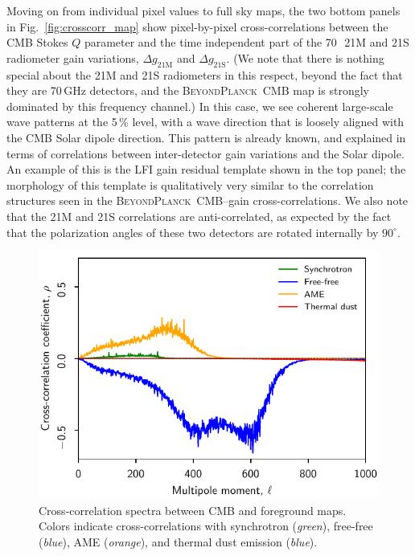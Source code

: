 \documentclass[twocolumn]{aa}
\newcommand{\BP}{\textsc{BeyondPlanck}}
\begin{document}
Moving on from individual pixel values to full sky maps, the two
bottom panels in Fig.~\ref{fig:crosscorr_map} show pixel-by-pixel
cross-correlations between the CMB Stokes $Q$ parameter and the
time independent part of the 70\,\GHz\ 21M and 21S radiometer gain variations,
$\Delta g_{\mathrm{21M}}$ and $\Delta g_{\mathrm{21S}}$. (We note that
there is nothing special about the 21M and 21S radiometers in this
respect, beyond the fact that they are 70\,GHz detectors, and the
\BP\ CMB map is strongly dominated by this frequency channel.) In this
case, we see coherent large-scale wave patterns at the 5\,\% level,
with a wave direction that is loosely aligned with the CMB Solar
dipole direction. This pattern is already known, and explained in
terms of correlations between inter-detector gain variations and the
Solar dipole. An example of this is the LFI gain residual template
\citep{planck2016-l02} shown in the top panel; the morphology of this
template is qualitatively very similar to the correlation structures
seen in the \BP\ CMB--gain cross-correlations. We also note that the
21M and 21S correlations are anti-correlated, as expected by the fact
that the polarization angles of these two detectors are rotated
internally by $90^{\circ}$. 

\begin{figure}
  \center	
  \includegraphics[width=\linewidth]{figs/crosscorr_CMB_fg_v1.pdf}
  \caption{Cross-correlation spectra between CMB and foreground maps. Colors indicate cross-correlations with synchrotron (\emph{green}), free-free (\emph{blue}), AME (\emph{orange}), and thermal dust emission (\emph{blue}). }
  \label{fig:fg_crosspec}
\end{figure}
\end{document}

